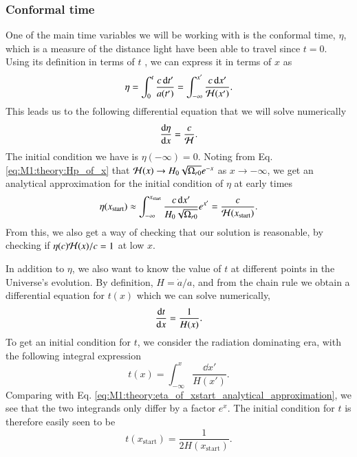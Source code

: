 \subsubsection{Conformal time}
One of the main time variables we will be working with is the conformal time, $\eta$, which is a measure of the distance light have been able to travel since $t=0$. Using its definition in terms of $t$ \cite[Eq. (2.90)]{Dodelson}, we can express it in terms of $x$ as 
\begin{equation}
    \eta = \int_0^t \frac{c \, \dd t'}{a(t')} = \int_{-\infty}^{x'} \frac{c\,\dd x'}{\mathcal{H}(x')}. \label{eq:M1:theory:eta_of_x_integral_expression}
\end{equation}
%
This leads us to the following differential equation that we will solve numerically 
\begin{equation}
    \dv{\eta}{x} = \frac{c}{\mathcal{H}}. \label{eq:M1:theory:deta_dx}
\end{equation}
%
The initial condition we have is $\eta(-\infty)=0$. Noting from Eq. \eqref{eq:M1:theory:Hp_of_x} that $\mathcal{H}(x)\to H_0\sqrt{\Omega_{r0}}e^{-x}$ as $x\to-\infty$, we get an analytical approximation for the initial condition of $\eta$ at early times 
\begin{align}
    \eta(x_\mathrm{start}) \approx \int_{-\infty}^{x_\mathrm{start}} \frac{c\,\dd x'}{H_0\sqrt{\Omega_{r0}}} e^{x'} = \frac{c}{\mathcal{H}(x_\mathrm{start})}. \label{eq:M1:theory:eta_of_xstart_analytical_approximation}
\end{align} 
%
From this, we also get a way of checking that our solution is reasonable, by checking if $\eta(c)\mathcal{H}(x)/c=1$ at low $x$.    
%

In addition to $\eta$, we also want to know the value of $t$ at different points in the Universe's evolution. By definition, $H=\dot{a}/a$, and from the chain rule we obtain a differential equation for $t(x)$ which we can solve numerically, 
\begin{equation}
    \dv{t}{x} = \frac{1}{H(x)}. \label{eq:M1:theory:cosmic_time_ODE}
\end{equation}
To get an initial condition for $t$, we consider the radiation dominating era, with the following integral expression 
\begin{equation}
    t(x) = \int_{-\infty}^x \frac{\dd x'}{H(x')}. \label{eq:M1:theory:t_of_x_integral_expression}
\end{equation} 
%
Comparing with Eq. \eqref{eq:M1:theory:eta_of_xstart_analytical_approximation}, we see that the two integrands only differ by a factor $e^x$. The initial condition for $t$ is therefore easily seen to be  
\begin{equation}
    t(x_\mathrm{start}) = \frac{1}{2H(x_\mathrm{start})}. \label{eq:M1:theory:t_of_xstart_analytical_approximation}
\end{equation} 


